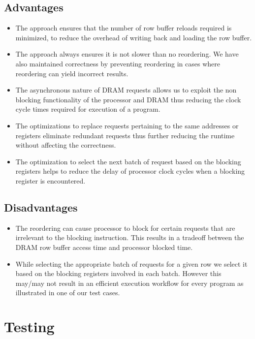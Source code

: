 \documentclass[hidelinks,12pt]{article}
\begin{document}
\subsection{Advantages}
\begin{itemize}
    \item The approach ensures that the number of row buffer reloads required is minimized, to reduce the overhead of writing back and loading the row buffer.
    \item The approach always ensures it is not slower than no reordering. We have also maintained correctness by preventing reordering in cases where reordering can yield incorrect results.
    \item The asynchronous nature of DRAM requests allows us to exploit the non blocking functionality of the processor and DRAM thus reducing the clock cycle times required for execution of a program.
    \item The optimizations to replace requests pertaining to the same addresses or registers eliminate redundant requests thus further reducing the runtime without affecting the correctness.
    \item The optimization to select the next batch of request based on the blocking registers helps to reduce the delay of processor clock cycles when a blocking register is encountered.
\end{itemize}
\subsection{Disadvantages}
\begin{itemize}
    \item The reordering can cause processor to block for certain requests that are irrelevant to the blocking instruction. This results in a tradeoff between the DRAM row buffer access time and processor blocked time.
    \item While selecting the appropriate batch of requests for a given row we select it based on the blocking registers involved in each batch. However this may/may not result in an efficient execution workflow for every program as illustrated in one of our test cases.
\end{itemize}
\section{Testing}
\end{document}
